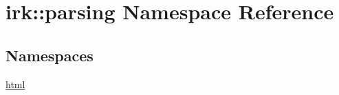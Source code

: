 \hypertarget{namespaceirk_1_1parsing}{}\section{irk\+:\+:parsing Namespace Reference}
\label{namespaceirk_1_1parsing}
\subsection*{Namespaces}
\begin{DoxyCompactItemize}
\item 
 \mbox{\hyperlink{namespaceirk_1_1parsing_1_1html}{html}}
\end{DoxyCompactItemize}
